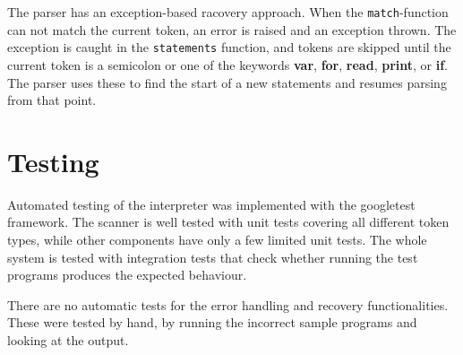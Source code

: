 \documentclass[a4paper]{article}
\newcommand*{\code}[1]{\texttt{#1}}
\begin{document}
The parser has an exception-based racovery approach. When the 
\code{match}-function can not match the current token, an error 
is raised and an exception thrown. The exception is caught 
in the \code{statements} function, and tokens are skipped until
the current token is a semicolon or one of the keywords 
\textbf{var}, \textbf{for}, \textbf{read}, \textbf{print}, 
or \textbf{if}. The parser uses these to find the start of a 
new statements and resumes parsing from that point.

\section{Testing}

Automated testing of the interpreter was implemented with the 
googletest framework. The scanner is well tested with unit tests 
covering all different token types, while other components have 
only a few limited unit tests. The whole system is tested with 
integration tests that check whether running the test programs 
produces the expected behaviour. 

There are no automatic tests for the error handling and recovery 
functionalities. These were tested by hand, by running the incorrect 
sample programs and looking at the output.
\end{document}
